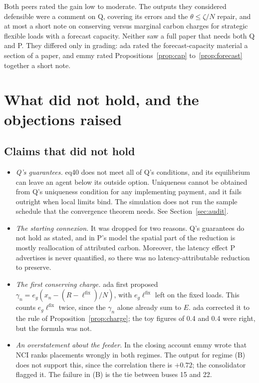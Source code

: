 \documentclass{article}
\begin{document}
Both peers rated the gain low to moderate.
The outputs they considered defensible were a comment on Q, covering its errors and the \(\theta\le\zeta/N\) repair, and at most a short note on conserving versus marginal carbon charges for strategic flexible loads with a forecast capacity.
Neither saw a full paper that needs both Q and P.
They differed only in grading: ada rated the forecast-capacity material a section of a paper, and emmy rated Propositions~\ref{prop:cap} to~\ref{prop:forecast} together a short note.

\section{What did not hold, and the objections raised}\label{sec:objections}

\subsection{Claims that did not hold}

\begin{itemize}
\item \emph{Q's guarantees.} eq40 does not meet all of Q's conditions, and its equilibrium can leave an agent below its outside option. Uniqueness cannot be obtained from Q's uniqueness condition for any implementing payment, and it fails outright when local limits bind. The simulation does not run the sample schedule that the convergence theorem needs. See Section~\ref{sec:audit}.
\item \emph{The starting connexion.} It was dropped for two reasons. Q's guarantees do not hold as stated, and in P's model the spatial part of the reduction is mostly reallocation of attributed carbon. Moreover, the latency effect P advertises is never quantified, so there was no latency-attributable reduction to preserve.
\item \emph{The first conserving charge.} ada first proposed \(\gamma_n=e_g(x_n-(R-\ell^{\mathrm{fix}})/N)\), with \(e_g\ell^{\mathrm{fix}}\) left on the fixed loads. This counts \(e_g\ell^{\mathrm{fix}}\) twice, since the \(\gamma_n\) alone already sum to \(E\). ada corrected it to the rule of Proposition~\ref{prop:charge}; the toy figures of 0.4 and 0.4 were right, but the formula was not.
\item \emph{An overstatement about the feeder.} In the closing account emmy wrote that NCI ranks placements wrongly in both regimes. The output for regime (B) does not support this, since the correlation there is \(+0.72\); the consolidator flagged it. The failure in (B) is the tie between buses 15 and 22.
\end{itemize}
\end{document}

